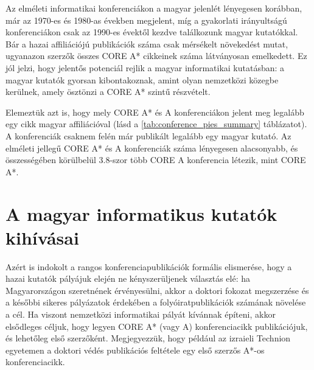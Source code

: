 \documentclass[12pt,a4paper]{article}
\begin{document}
%

Az elméleti informatikai konferenciákon a magyar jelenlét lényegesen korábban, már az 1970-es és 1980-as években megjelent, míg a gyakorlati irányultságú konferenciákon csak az 1990-es évektől kezdve találkozunk magyar kutatókkal. Bár a hazai affiliációjú publikációk száma csak mérsékelt növekedést mutat, ugyanazon szerzők összes CORE A\!* cikkeinek száma látványosan emelkedett. Ez jól jelzi, hogy jelentős potenciál rejlik a magyar informatikai kutatásban: a magyar kutatók gyorsan kibontakoznak, amint olyan nemzetközi közegbe kerülnek, amely ösztönzi a CORE A\!* szintű részvételt.

Elemeztük azt is, hogy mely CORE A\!* és A konferenciákon jelent meg legalább egy cikk magyar affiliációval (lásd a \ref{tab:conference_pies_summary} táblázatot). A konferenciák csaknem felén már publikált legalább egy magyar kutató. Az elméleti jellegű CORE A\!* és A konferenciák száma lényegesen alacsonyabb, és összességében körülbelül 3.8-szor több CORE A konferencia létezik, mint CORE A\!*.



\section{A magyar informatikus kutatók kihívásai}


Azért is indokolt a rangos konferenciapublikációk formális elismerése, hogy a hazai kutatók pályájuk elején ne kényszerüljenek választás elé: ha Magyarországon szeretnének érvényesülni, akkor a doktori fokozat megszerzése és a későbbi sikeres pályázatok érdekében a folyóiratpublikációk számának növelése a cél. Ha viszont nemzetközi informatikai pályát kívánnak építeni, akkor elsődleges céljuk, hogy legyen CORE A\!* (vagy A) konferenciacikk publikációjuk, és lehetőleg első szerzőként. Megjegyezzük, hogy például az izraieli Technion egyetemen a doktori védés publikációs feltétele egy első szerzős A\!*-os konferenciacikk.
\end{document}
